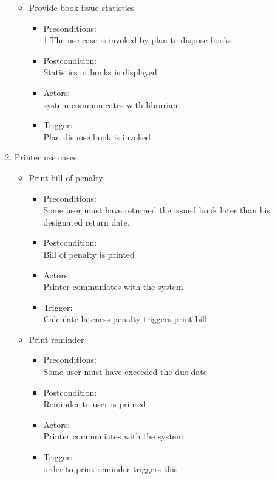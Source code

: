 \documentclass[a4paper]{article}
\begin{document}
\begin{enumerate}
\begin{itemize}
 \item Provide book issue statistics
	\begin{itemize}
	\item  Preconditions:\\ 1.The use case is invoked by plan to dispose books\\ 
 \item Postcondition:\\ Statistics of books is displayed\\ 
 \item Actors: \\ system communicates with librarian\\ 
 \item Trigger:\\ Plan dispose book is invoked\\ 
	\end{itemize}

 \end{itemize}
\item Printer use cases:\\ 
\begin{itemize}
\item Print bill of penalty\\ 
\begin{itemize}
\item Preconditions:\\ Some user must have returned the issued book later than his designated return date.\\ 
 \item Postcondition:\\ Bill of penalty is printed\\ 
 \item Actors:\\  Printer communiates with the system\\ 
 \item Trigger:\\  Calculate lateness penalty triggers print bill\\ 
\end{itemize}

\item Print reminder\\ 
\begin{itemize}
\item  Preconditions:\\ Some user must have exceeded the due date\\ 
 \item Postcondition:\\ Reminder to user is printed\\ 
 \item Actors:\\  Printer communiates with the system\\ 
 \item Trigger:\\ order to print reminder triggers this\\ 
\end{itemize}


\end{itemize}
\end{enumerate}
\end{document}
